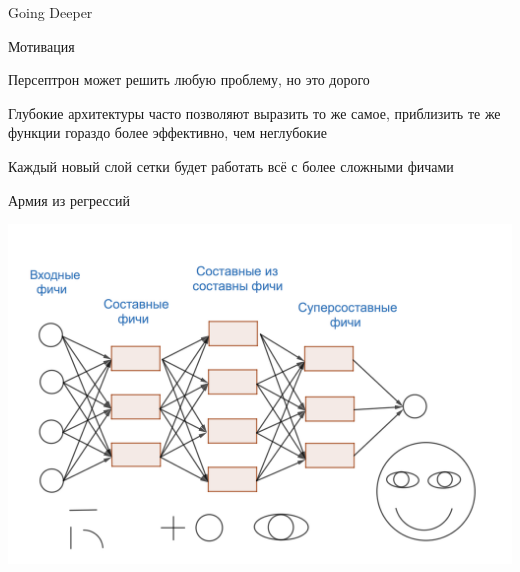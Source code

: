 \documentclass[notes,12pt, aspectratio=169]{beamer}
\newenvironment{wideitemize}{\itemize\addtolength{\itemsep}{10pt}}{\enditemize}
\begin{document}
{
	\begin{frame}[fragile]
	\vspace{6.5cm}
	\begin{center}
		{\color{white} \Huge{Going Deeper}}
	\end{center}
\end{frame}
}


\begin{frame}{Мотивация}
	\begin{wideitemize}
		\item Персептрон может решить любую проблему, но это дорого
		
		\item Глубокие архитектуры часто позволяют выразить то же самое, приблизить те же функции гораздо более эффективно, чем неглубокие
		
		\item Каждый новый слой сетки будет работать всё с более сложными фичами
	\end{wideitemize}
\end{frame}


\begin{frame}{Армия из регрессий}
	\begin{center}
		\includegraphics[width=0.73\paperwidth]{network_1.png}
	\end{center}
\end{frame}
\end{document}

